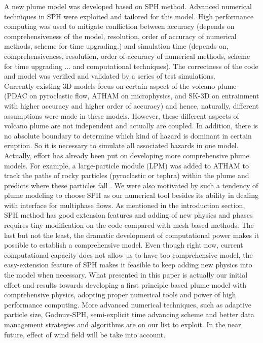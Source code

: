 \documentclass[journal abbreviation, manuscript]{copernicus}
\begin{document}
%
\conclusions  \label{sec:conclusion}%
A new plume model was developed based on SPH method. Advanced numerical techniques in SPH were exploited and tailored for this model. High performance computing was used to mitigate confliction between accuracy (depends on comprehensiveness of the model, resolution, order of accuracy of numerical methods, scheme for time upgrading.) and simulation time (depends on, comprehensiveness, resolution, order of accuracy of numerical methods, scheme for time upgrading ... and computational techniques). The correctness of the code and model was verified and validated by a series of test simulations.\\
Currently existing 3D models focus on certain aspect of the volcano plume (PDAC on pyroclastic flow, ATHAM on microphysics, and SK-3D on entrainment with higher accuracy and higher order of accuracy) and hence, naturally, different assumptions were made in these models. However, these different aspects of volcano plume are not independent and actually are coupled. In addition, there is no absolute boundary to determine which kind of hazard is dominant in certain eruption. So it is necessary to simulate all associated hazards in one model. Actually, effort has already been put on developing more comprehensive plume models. For example, a large-particle module (LPM) was added to ATHAM to track the paths of rocky particles (pyroclastic or tephra) within the plume and predicts where these particles fall \citep{kobs2009modeling}. We were also motivated by such a tendency of plume modeling to choose SPH as our numerical tool besides its ability in dealing with interface for multiphase flows. As mentioned in the introduction section, SPH method has good extension features and adding of new physics and phases requires tiny modification on the code compared with mesh based methods. The last but not the least, the dramatic development of computational power makes it possible to establish a comprehensive model. Even though right now, current computational capacity does not allow us to have too comprehensive model, the easy-extension feature of SPH makes it feasible to keep adding new physics into the model when necessary. What presented in this paper is actually our initial effort and results towards developing a first principle based plume model with comprehensive physics, adopting proper numerical tools and power of high performance computing. More advanced numerical techniques, such as adaptive particle size, Godnuv-SPH, semi-explicit time advancing scheme and better data management strategies and algorithms are on our list to exploit. In the near future, effect of wind field will be take into account. 
\end{document}
